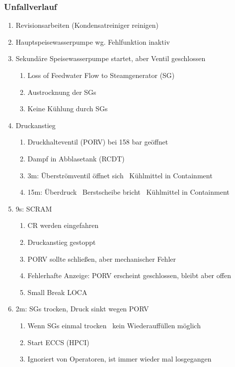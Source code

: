 \documentclass[12pt]{article}
\begin{document}
\subsubsection{Unfallverlauf}
\begin{enumerate}
	\item Revisionsarbeiten (Kondensatreiniger reinigen)
	\item Hauptspeisewasserpumpe wg. Fehlfunktion inaktiv
	\item Sekundäre Speisewasserpumpe startet, aber Ventil geschlossen
		\begin{enumerate}[label = \textrightarrow]
			\item Loss of Feedwater Flow to Steamgenerator (SG)
			\item Austrocknung der SGs
			\item Keine Kühlung durch SGs
		\end{enumerate}
	\item Druckanstieg
		\begin{enumerate}[label = \textrightarrow]
			\item Druckhalteventil (PORV) bei 158 bar geöffnet
			\item Dampf in Abblasetank (RCDT)
			\item 3m: Überströmventil öffnet sich \textrightarrow\ Kühlmittel in Containment
			\item 15m: Überdruck \textrightarrow\ Berstscheibe bricht \textrightarrow\ Kühlmittel in Containment
		\end{enumerate}
	\item 9s: SCRAM
		\begin{enumerate}[label = \textrightarrow]
			\item CR werden eingefahren
			\item Druckanstieg gestoppt
			\item PORV sollte schließen, aber mechanischer Fehler
			\item Fehlerhafte Anzeige: PORV erscheint geschlossen, bleibt aber offen
			\item Small Break LOCA
		\end{enumerate}
	\item 2m: SGs trocken, Druck sinkt wegen PORV
		\begin{enumerate}[label = \textrightarrow]
			\item Wenn SGs einmal trocken \textrightarrow\ kein Wiederauffüllen möglich
			\item Start ECCS (HPCI)
			\item Ignoriert von Operatoren, ist immer wieder mal losgegangen

\end{enumerate}
\end{enumerate}
\end{document}
